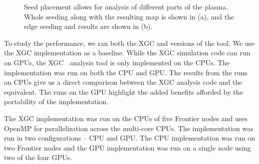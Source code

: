 \begin{figure}[ht]
 \centering

\caption{Seed placement allows for analysis of different parts of the plasma. Whole seeding along with the resulting \poincare map is shown in (a), and the edge seeding and results are shown in (b).}
\vspace{-5pt}
\label{fig:seeding}
\end{figure}


To study the performance, we ran both the XGC and \vtkm versions of the \poincare tool. We use the XGC implementation as a baseline. While the XGC simulation code can run on GPUs, the XGC \poincare\ analysis tool is only implemented on the CPUs. 
The \vtkm implementation was run on both the CPU and GPU. The results from the runs on CPUs give us a direct comparison between the XGC analysis code and the \vtkm equivalent. The runs on the GPU highlight the added benefits afforded by the portability of the \vtkm implementation.

The XGC implementation was run on the CPUs of five Frontier nodes and uses OpenMP for parallelization across the multi-core CPUs.
The \vtkm implementation was run in two configurations -- CPU and GPU.
The CPU implementation was run on two Frontier nodes and the GPU implementation was run on a single node using two of the four GPUs.

